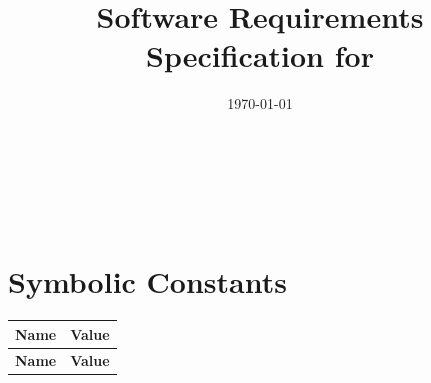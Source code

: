 \documentclass[12pt]{article}
\begin{document}
\title{Software Requirements Specification for \progname}
\author{\authname}
\date{\today}

\maketitle

~\newpage


\tableofcontents
~\newpage

\section*{Symbolic Constants}

\begin{longtable}{p{}p{}}
\toprule
\textbf{Name} & \textbf{Value} \\
\midrule
\endfirsthead

\toprule
\textbf{Name} & \textbf{Value} \\
\midrule
\endhead


\end{longtable}
\end{document}
